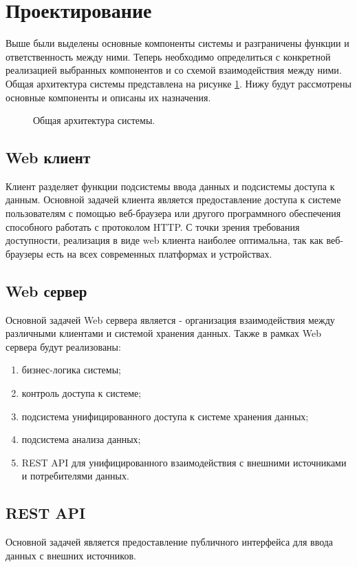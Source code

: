 \newpage
{}
\section{Проектирование}
Выше были выделены основные компоненты системы и разграничены функции и
ответственность между ними. Теперь необходимо определиться с конкретной
реализацией выбранных компонентов и со схемой взаимодействия между ними. 
Общая архитектура системы представлена на рисунке
\ref{ris:general_architecture}. Нижу будут рассмотрены основные компоненты
и описаны их назначения.

\begin{figure}[h]
\caption{Общая архитектура системы.}
\label{ris:general_architecture}
\end{figure}

\subsection{Web клиент}
Клиент разделяет функции подсистемы ввода данных и подсистемы доступа к данным.
Основной задачей клиента является предоставление доступа к системе пользователям
с помощью веб-браузера или другого программного обеспечения способного работать
с протоколом HTTP. С точки зрения требования доступности, реализация в виде web
клиента наиболее оптимальна, так как веб-браузеры есть на всех современных
платформах и устройствах.

\subsection{Web сервер}
Основной задачей Web сервера является - организация взаимодействия между
различными клиентами и системой хранения данных. Также в рамках Web сервера
будут реализованы:
\begin{enumerate}
  \item бизнес-логика системы;
  \item контроль доступа к системе;
  \item подсистема унифицированного доступа к системе хранения данных;
  \item подсистема анализа данных;
  \item REST API для унифицированного взаимодействия с внешними источниками и
потребителями данных.
\end{enumerate}

\subsection{REST API}
Основной задачей является предоставление публичного интерфейса для ввода данных
с внешних источников.

